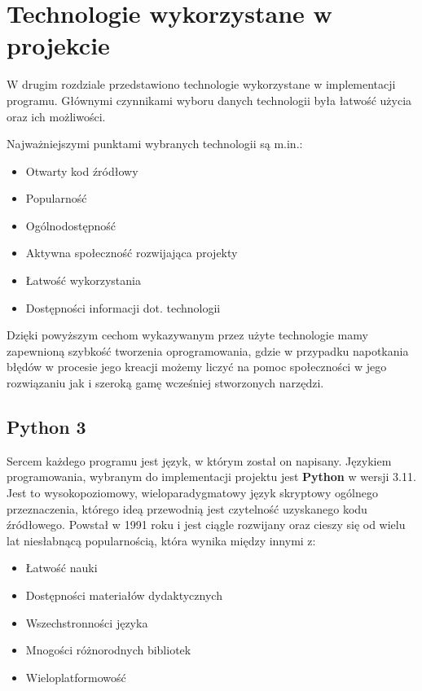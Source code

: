 \chapter{Technologie wykorzystane w projekcie}

W drugim rozdziale przedstawiono technologie wykorzystane w implementacji programu. Głównymi czynnikami wyboru danych technologii była łatwość użycia oraz ich możliwości.

Najważniejszymi punktami wybranych technologii są m.in.:
\begin{itemize}
	\item Otwarty kod źródłowy
	\item Popularność
	\item Ogólnodostępność
	\item Aktywna społeczność rozwijająca projekty
	\item Łatwość wykorzystania
	\item Dostępności informacji dot. technologii
\end{itemize}

Dzięki powyższym cechom wykazywanym przez użyte technologie mamy zapewnioną szybkość tworzenia oprogramowania, gdzie w przypadku napotkania błędów w procesie jego kreacji możemy liczyć na pomoc społeczności w jego rozwiązaniu jak i szeroką gamę wcześniej stworzonych narzędzi.



\section{Python 3}
Sercem każdego programu jest język, w którym został on napisany. Językiem programowania, wybranym do implementacji projektu jest \textbf{Python} w wersji 3.11.
Jest to wysokopoziomowy, wieloparadygmatowy język skryptowy ogólnego przeznaczenia, którego ideą przewodnią jest czytelność uzyskanego kodu źródłowego. Powstał w 1991 roku i jest ciągle rozwijany oraz cieszy się od wielu lat niesłabnącą popularnością, która wynika między innymi z:

\begin{itemize}
	\item Łatwość nauki
	\item Dostępności materiałów dydaktycznych
	\item Wszechstronności języka
	\item Mnogości różnorodnych bibliotek
	\item Wieloplatformowość
\end{itemize}


